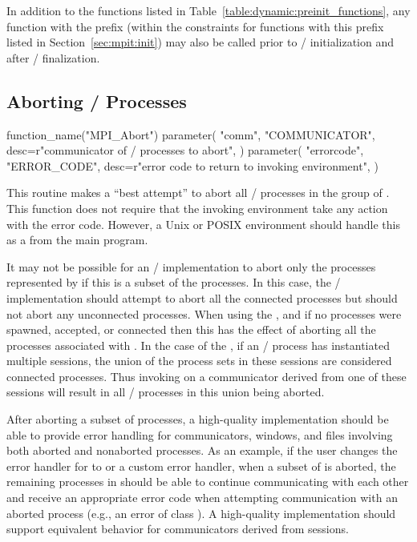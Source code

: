 In addition to the functions listed in Table~\ref{table:dynamic:preinit_functions}, any function with the prefix  (within the constraints for functions with this prefix listed in Section~\ref{sec:mpit:init}) may also be called prior to \MPI/ initialization and after \MPI/ finalization.

\subsection{Aborting \texorpdfstring{\mpi/}{MPI} Processes}

\begin{mpi-binding}
    function_name("MPI_Abort")
    parameter(
        "comm",
        "COMMUNICATOR",
        desc=r"communicator of \MPI/ processes to abort",
    )
    parameter(
        "errorcode",
        "ERROR_CODE",
        desc=r"error code to return to invoking environment",
    )
\end{mpi-binding}

This routine makes a ``best attempt'' to abort all \MPI/ processes in the group
of .
This function does not require that the invoking environment take any action
with the error code.  However, a Unix or POSIX environment should handle this
as a  from the main program.


It may not be possible for an \MPI/ implementation to abort only the
processes represented by  if this is a subset of the processes.
In this case, the \MPI/ implementation should attempt to abort all the connected
processes but should not abort any unconnected processes.
When using the \wpm{}, and
if no processes were spawned, accepted, or connected then this has the effect
of aborting all the processes associated with .
In the case of the \spm{}, if an \MPI/ process
has instantiated multiple sessions, the union of the process sets in these
sessions are considered connected processes.  Thus invoking  on
a communicator derived from one of these sessions will result in all \MPI/ processes
in this union being aborted.

\begin{implementors}
    After aborting a subset of processes, a high-quality implementation should
    be able to provide error handling for communicators, windows, and files
    involving both aborted and nonaborted processes. As an example, if the
    user changes the error handler for  to
     or a custom error handler, when a subset of
     is aborted, the remaining processes in
     should be able to continue communicating with each
    other and receive an appropriate error code when attempting communication
    with an aborted process (e.g., an error of class ).
    A high-quality implementation should support
    equivalent behavior for communicators derived from sessions.
\end{implementors}

